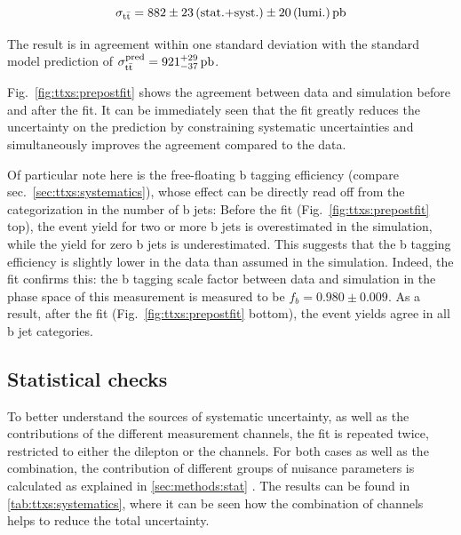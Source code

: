 \[
    \sigma_{\mathrm{t \bar{t}}} = 882 \pm 23 \, \text{(stat.+syst.)} \pm 20 \, \text{(lumi.)} \, \text{pb}
\]

The result is in agreement within one standard deviation with the standard model prediction of $\sigma_{\mathrm{t \bar{t}}}^{\text{pred}} = 921^{+29}_{-37} \, \text{pb}$.

Fig.~\ref{fig:ttxs:prepostfit} shows the agreement between data and simulation before and after the fit. It can be immediately seen that the fit greatly reduces the uncertainty on the prediction by constraining systematic uncertainties and simultaneously improves the agreement compared to the data. 

Of particular note here is the free-floating b tagging efficiency (compare sec.~\ref{sec:ttxs:systematics}), whose effect can be directly read off from the categorization in the number of b jets: Before the fit (Fig.~\ref{fig:ttxs:prepostfit} top), the event yield for two or more b jets is overestimated in the simulation, while the yield for zero b jets is underestimated. This suggests that the b tagging efficiency is slightly lower in the data than assumed in the simulation. Indeed, the fit confirms this: the b tagging scale factor between data and simulation in the phase space of this measurement is measured to be $f_b  = 0.980 \pm 0.009$. As a result, after the fit (Fig.~\ref{fig:ttxs:prepostfit} bottom), the event yields agree in all b jet categories.

\subsection{Statistical checks}

To better understand the sources of systematic uncertainty, as well as the contributions of the different measurement channels, the fit is repeated twice, restricted to either the dilepton or the \ljets channels. For both cases as well as the combination, the contribution of different groups of nuisance parameters is calculated as explained in \cref{sec:methods:stat} . The results can be found in \cref{tab:ttxs:systematics}, where it can be seen how the combination of channels helps to reduce the total uncertainty. 

